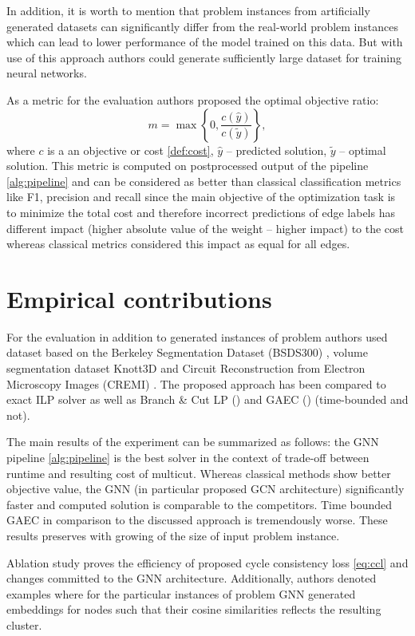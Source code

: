 \documentclass[10pt, twocolumn, a4paper]{article}
\theoremstyle{definition}
\begin{document}
In addition, it is worth to mention that problem instances from artificially generated datasets can
significantly differ from the real-world problem instances which can lead to lower performance of the model
trained on this data. But with use of this approach authors could generate sufficiently large
dataset for training neural networks.

As a metric for the evaluation authors proposed the optimal objective ratio:
\[
    m = \max \left\{ 0, \frac{c(\hat{y})}{c(\tilde{y})} \right\},
\]
where $c$ is a an objective or cost \eqref{def:cost}, $\hat{y}$ -- predicted solution,
$\tilde{y}$ -- optimal solution. This metric is computed on postprocessed output of the
pipeline \ref{alg:pipeline} and can be considered as better than classical classification
metrics like F1, precision and recall since the main objective of the optimization task is to
minimize the total cost and therefore incorrect predictions of edge labels has different impact (higher absolute value
of the weight -- higher impact) to the cost whereas classical metrics considered this impact as
equal for all edges.

\section{Empirical contributions} \label{sec:empirical_contib}

For the evaluation in addition to generated instances of problem authors used
dataset \citet{andres2011probabilistic} based on the Berkeley Segmentation Dataset (BSDS300) \citet{martin2001database},
volume segmentation dataset Knott3D \citet{andres2012globally} and
Circuit Reconstruction from Electron Microscopy Images (CREMI) \citet{beier2017multicut}.
The proposed approach has been compared to exact ILP solver as well as Branch \& Cut LP (\citet{kappes2015comparative})
and GAEC (\citet{keuper2015efficient}) (time-bounded and not).

The main results of the experiment can be summarized as follows: the GNN pipeline \ref{alg:pipeline}
is the best solver in the context of trade-off between runtime and resulting cost of multicut. Whereas
classical methods show better objective value, the GNN (in particular proposed GCN architecture)
significantly faster and computed solution is comparable to the competitors. Time bounded GAEC in comparison
to the discussed approach is tremendously worse. These results preserves with growing of the size of
input problem instance.

Ablation study proves the efficiency of proposed cycle consistency loss \eqref{eq:ccl} and changes committed to
the GNN architecture. Additionally, authors denoted examples where for the particular instances of problem
GNN generated embeddings for nodes such that their cosine similarities reflects the resulting cluster.
\end{document}
